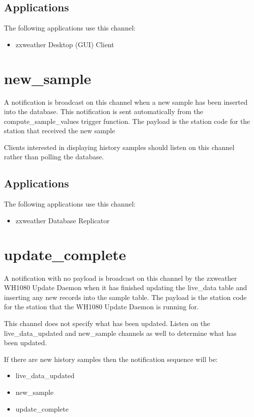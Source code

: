 \documentclass[a4paper,10pt]{book}
\begin{document}
\subsection{Applications}
The following applications use this channel:

\begin{itemize}
\item zxweather Desktop (GUI) Client
\end{itemize}

\section{new\_sample}
A notification is broadcast on this channel when a new sample has been inserted into the database. This notification is sent automatically from the compute\_sample\_values trigger function. The payload is the station code for the station that received the new sample

Clients interested in displaying history samples should listen on this channel rather than polling the database.

\subsection{Applications}
The following applications use this channel:

\begin{itemize}
\item zxweather Database Replicator
\end{itemize}

\section{update\_complete}
A notification with no payload is broadcast on this channel by the zxweather WH1080 Update Daemon when it has finished updating the live\_data table and inserting any new records into the sample table. The payload is the station code for the station that the WH1080 Update Daemon is running for.

This channel does not specify what has been updated. Listen on the live\_data\_updated and new\_sample channels as well to determine what has been updated.

If there are new history samples then the notification sequence will be:
\begin{itemize}
\item live\_data\_updated
\item new\_sample
\item update\_complete
\end{itemize}
\end{document}
